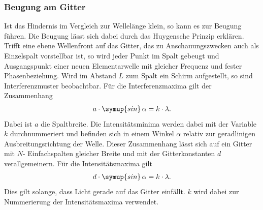 \subsubsection{Beugung am Gitter}
\label{sec:Gitter}
Ist das Hindernis im Vergleich zur Wellelänge klein, so kann es zur Beugung führen. Die Beugung lässt sich dabei durch das Huygensche
Prinzip erklären.\\
Trifft eine ebene Wellenfront auf das Gitter, das zu Anschauungszwecken auch als Einzelspalt vorstellbar ist, so wird jeder Punkt im
Spalt gebeugt und Ausgangspunkt einer neuen Elementarwelle mit gleicher Frequenz und fester Phasenbeziehung. Wird im Abstand $L$ zum Spalt
ein Schirm aufgestellt, so sind Interferenzmuster beobachtbar. Für die Interferenzmaxima gilt der Zusammenhang
\begin{align}
    \label{eqn:minima}
    a\cdot\symup{sin}\,\alpha = k\cdot\lambda.
\end{align}
Dabei ist $a$ die Spaltbreite. Die Intensitätsminima werden dabei mit der Variable $k$ durchnummeriert und befinden sich in einem
Winkel $\alpha$ relativ zur geradlinigen Ausbreitungsrichtung der Welle. Dieser Zusammenhang lässt sich auf ein Gitter mit $N$-
Einfachspalten gleicher Breite und mit der Gitterkonstanten $d$ verallgemeinern. Für die Intensitätsmaxima gilt
\begin{align}
    d\cdot\symup{sin}\,\alpha = k\cdot\lambda.
\end{align}
Dies gilt solange, dass Licht gerade auf das Gitter einfällt. $k$ wird dabei zur Nummerierung der Intensitätsmaxima verwendet.